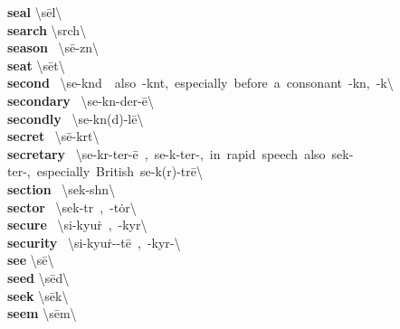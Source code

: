 \documentclass[10pt,a4paper]{article}
\begin{document}
\begin{multicols}{2}
\textbf{ seal }\quad \textbackslash \textprimstress s\={e}l\textbackslash \\
\textbf{ search }\quad \textbackslash \textprimstress s\textschwa rch\textbackslash \\
\textbf{ season }\quad \ \textbackslash \textprimstress s\={e}-z\textsuperscript{\textreve}n\textbackslash \\
\textbf{ seat }\quad \textbackslash \textprimstress s\={e}t\textbackslash \\
\textbf{ second }\quad \ \textbackslash \textprimstress se-k\textschwa nd\ \ also\ -k\textschwa nt,\ especially\ before\ a\ consonant\ -k\textschwa n,\ -k\textsuperscript{\textreve}\engma \textbackslash \\
\textbf{ secondary }\quad \ \textbackslash \textprimstress se-k\textschwa n-\textsecstress der-\={e}\textbackslash \\
\textbf{ secondly }\quad \ \textbackslash \textprimstress se-k\textschwa n(d)-l\={e}\textbackslash \\
\textbf{ secret }\quad \ \textbackslash \textprimstress s\={e}-kr\textschwa t\textbackslash \\
\textbf{ secretary }\quad \ \textbackslash \textprimstress se-kr\textschwa -\textsecstress ter-\={e}\ ,\ \textprimstress se-k\textschwa -\textsecstress ter-,\ in\ rapid\ speech\ also\ \textprimstress sek-\textsecstress ter-,\ especially\ British\ \textprimstress se-k(r)\textschwa -tr\={e}\textbackslash \\
\textbf{ section }\quad \ \textbackslash \textprimstress sek-sh\textschwa n\textbackslash \\
\textbf{ sector }\quad \ \textbackslash \textprimstress sek-t\textschwa r\ ,\ -\textsecstress t\.{o}r\textbackslash \\
\textbf{ secure }\quad \ \textbackslash si-\textprimstress kyu\. r\ ,\ -\textprimstress ky\textschwa r\textbackslash \\
\textbf{ security }\quad \ \textbackslash si-\textprimstress kyu\. r-\textschwa -t\={e}\ ,\ -\textprimstress ky\textschwa r-\textbackslash \\
\textbf{ see }\quad \textbackslash \textprimstress s\={e}\textbackslash \\
\textbf{ seed }\quad \textbackslash \textprimstress s\={e}d\textbackslash \\
\textbf{ seek }\quad \textbackslash \textprimstress s\={e}k\textbackslash \\
\textbf{ seem }\quad \textbackslash \textprimstress s\={e}m\textbackslash \\

\end{multicols}
\end{document}
